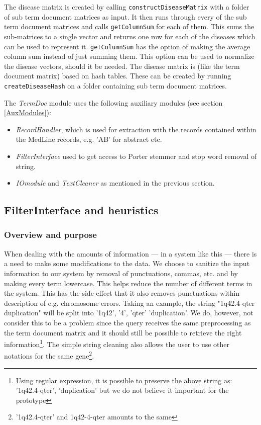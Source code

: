 The disease matrix is created by calling
\texttt{constructDiseaseMatrix} with a folder of sub term document
matrices as input. It then runs through every of the sub term document
matrices and calls \texttt{getColumnSum} for each of them. This sums
the sub-matrices to a single vector and returns one row for each of
the diseases which can be used to represent it. \texttt{getColumnSum}
has the option of making the average column sum instead of just
summing them. This option can be used to normalize the disease
vectors, should it be needed. The disease matrix is (like the term
document matrix) based on hash tables. These can be created by running
\texttt{createDiseaseHash} on a folder containing sub term document
matrices.

The \textit{TermDoc} module uses the following auxiliary modules (see
section \ref{AuxModules}):

\begin{itemize}
  \item \textit{RecordHandler}, which is used for extraction with the
    records contained within the MedLine records, e.g. 'AB' for
    abstract etc.
  \item \textit{FilterInterface} used to get access to Porter stemmer
    and stop word removal of string.
  \item \textit{IOmodule} and \textit{TextCleaner} as mentioned in the
    previous section.
\end{itemize}

\subsection{FilterInterface and heuristics}

\subsubsection{Overview and purpose}
When dealing with the amounts of information --- in a system like this ---
there is a need to make some modifications to the data. We choose to
sanitize the input information to our system by removal of
punctuations, commas, etc. and by making every term lowercase. This
helps reduce the number of different terms in the system. This has the
side-effect that it also removes punctuations within description of
e.g. chromosome errors. Taking an example, the string "1q42.4-qter
duplication" will be split into '1q42', '4', 'qter' 'duplication'. We
do, however, not consider this to be a problem since the query
receives the same preprocessing as the term document matrix and it
should still be possible to retrieve the right
information\footnote{Using regular expression, it is possible to
  preserve the above string as: '1q42.4-qter', 'duplication' but we do
  not believe it important for the prototype}. The simple string
cleaning also allows the user to use other notations for the same
gene\footnote{'1q42.4-qter' and 1q42-4-qter amounts to the same}.

